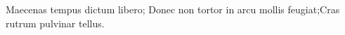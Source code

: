 \noindent Maecenas tempus dictum libero; Donec non tortor in arcu mollis feugiat;Cras rutrum pulvinar tellus.